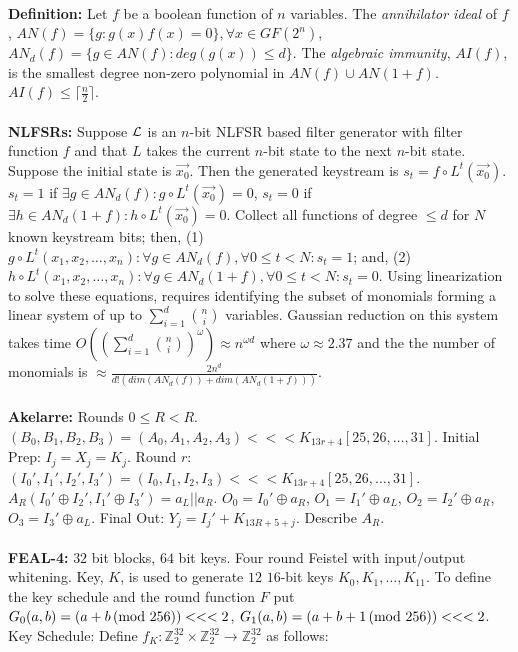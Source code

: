 \\
{\bf Definition:}
Let $f$ be a boolean function of $n$ variables.  The \emph{annihilator ideal} of $f$,
$AN(f) = \{ g: g(x) f(x)=0 \}, \forall x \in GF(2^n)$,
$AN_d(f) = \{ g \in AN(f): deg(g(x)) \le d \}$.  The \emph{algebraic immunity},
$AI(f)$, is the smallest degree non-zero polynomial in
$AN(f) \cup AN(1+f)$.  $AI(f) \le \lceil {\frac n 2} \rceil$.
\\
\\
{\bf NLFSRs:}
Suppose ${\cal L}$ is an $n$-bit NLFSR based filter generator with filter function
$f$ and that $L$ takes the current $n$-bit state to the next $n$-bit
state. Suppose the initial state is ${\vec {x_0}}$. Then
the generated keystream is $s_t = f \circ L^t({\vec {x_0}})$.
$s_t=1$ if $\exists g \in AN_d(f): g \circ L^t({\vec {x_0}})=0$,
$s_t=0$ if $\exists h \in AN_d(1+f): h \circ L^t({\vec {x_0}})=0$.
Collect all functions of degree $\le d$ for $N$ known keystream bits; then,
(1) $g \circ L^t(x_1, x_2, \ldots, x_n): \forall g \in AN_d(f), \forall 0 \le t < N:
s_t=1$; and,
(2) $h \circ L^t(x_1, x_2, \ldots, x_n): \forall g \in AN_d(1+f), \forall 0 \le t < N:
s_t=0$.  Using linearization to solve these equations, requires identifying 
the subset of monomials forming a linear
system of up to $\sum_{i=1}^d {n \choose i}$ variables.  Gaussian reduction on this
system takes time
$O((\sum_{i=1}^d {n \choose i})^{\omega}) \approx n^{\omega d}$
where $\omega \approx 2.37$ and the
the number of monomials is 
$\approx {\frac {2 n^d} {d!(dim(AN_d(f))+ dim(AN_d(1+f)))}}$.
\\
\\
{\bf Akelarre:}
Rounds $0 \le R <R$.  
$(B_0, B_1, B_2, B_3)= (A_0, A_1, A_2, A_3)<<< K_{13r+4}[25, 26, \ldots, 31]$. Initial
Prep: $I_j= X_j = K_j$.  Round $r$:
$(I_0', I_1', I_2', I_3')= (I_0, I_1, I_2, I_3)<<< K_{13r+4}[25, 26, \ldots, 31]$. 
$A_R(I_0' \oplus I_2', I_1' \oplus I_3')= a_L||a_R$.
$O_0= I_0' \oplus a_R$,
$O_1= I_1' \oplus a_L$,
$O_2= I_2' \oplus a_R$,
$O_3= I_3' \oplus a_L$.
Final Out: $Y_j=I_j' + K_{13R+5+j}$.
Describe $A_R$.
\\
\\
{\bf FEAL-4:}  $32$ bit blocks, $64$ bit keys.  
Four round Feistel with input/output whitening.  Key, $K$, is used to generate $12$
$16$-bit keys $K_0 , K_1 , \ldots , K_{11}$.
To define the key schedule and the round function $F$ put
$G_0(a,b)= (a+b \thinspace \textnormal{(mod } 256 \textnormal{)}) <<<2$,
$G_1(a,b)= (a+b+1 \thinspace \textnormal{(mod } 256 \textnormal{)}) <<<2$.  
Key Schedule: Define 
$f_K: {\mathbb Z}_2^{32} \times {\mathbb Z}_2^{32} \rightarrow {\mathbb Z}_2^{32} $ as follows:
